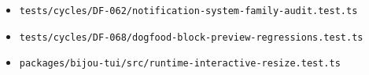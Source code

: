 \begin{itemize}
\tightlist
\item
  \texttt{t\allowbreak{}e\allowbreak{}s\allowbreak{}t\allowbreak{}s\allowbreak{}/\allowbreak{}c\allowbreak{}y\allowbreak{}c\allowbreak{}l\allowbreak{}e\allowbreak{}s\allowbreak{}/\allowbreak{}D\allowbreak{}F\allowbreak{}-\allowbreak{}0\allowbreak{}6\allowbreak{}2\allowbreak{}/\allowbreak{}n\allowbreak{}o\allowbreak{}t\allowbreak{}i\allowbreak{}f\allowbreak{}i\allowbreak{}c\allowbreak{}a\allowbreak{}t\allowbreak{}i\allowbreak{}o\allowbreak{}n\allowbreak{}-\allowbreak{}s\allowbreak{}y\allowbreak{}s\allowbreak{}t\allowbreak{}e\allowbreak{}m\allowbreak{}-\allowbreak{}f\allowbreak{}a\allowbreak{}m\allowbreak{}i\allowbreak{}l\allowbreak{}y\allowbreak{}-\allowbreak{}a\allowbreak{}u\allowbreak{}d\allowbreak{}i\allowbreak{}t\allowbreak{}.\allowbreak{}t\allowbreak{}e\allowbreak{}s\allowbreak{}t\allowbreak{}.\allowbreak{}t\allowbreak{}s}
\item
  \texttt{t\allowbreak{}e\allowbreak{}s\allowbreak{}t\allowbreak{}s\allowbreak{}/\allowbreak{}c\allowbreak{}y\allowbreak{}c\allowbreak{}l\allowbreak{}e\allowbreak{}s\allowbreak{}/\allowbreak{}D\allowbreak{}F\allowbreak{}-\allowbreak{}0\allowbreak{}6\allowbreak{}8\allowbreak{}/\allowbreak{}d\allowbreak{}o\allowbreak{}g\allowbreak{}f\allowbreak{}o\allowbreak{}o\allowbreak{}d\allowbreak{}-\allowbreak{}b\allowbreak{}l\allowbreak{}o\allowbreak{}c\allowbreak{}k\allowbreak{}-\allowbreak{}p\allowbreak{}r\allowbreak{}e\allowbreak{}v\allowbreak{}i\allowbreak{}e\allowbreak{}w\allowbreak{}-\allowbreak{}r\allowbreak{}e\allowbreak{}g\allowbreak{}r\allowbreak{}e\allowbreak{}s\allowbreak{}s\allowbreak{}i\allowbreak{}o\allowbreak{}n\allowbreak{}s\allowbreak{}.\allowbreak{}t\allowbreak{}e\allowbreak{}s\allowbreak{}t\allowbreak{}.\allowbreak{}t\allowbreak{}s}
\item
  \texttt{p\allowbreak{}a\allowbreak{}c\allowbreak{}k\allowbreak{}a\allowbreak{}g\allowbreak{}e\allowbreak{}s\allowbreak{}/\allowbreak{}b\allowbreak{}i\allowbreak{}j\allowbreak{}o\allowbreak{}u\allowbreak{}-\allowbreak{}t\allowbreak{}u\allowbreak{}i\allowbreak{}/\allowbreak{}s\allowbreak{}r\allowbreak{}c\allowbreak{}/\allowbreak{}r\allowbreak{}u\allowbreak{}n\allowbreak{}t\allowbreak{}i\allowbreak{}m\allowbreak{}e\allowbreak{}-\allowbreak{}i\allowbreak{}n\allowbreak{}t\allowbreak{}e\allowbreak{}r\allowbreak{}a\allowbreak{}c\allowbreak{}t\allowbreak{}i\allowbreak{}v\allowbreak{}e\allowbreak{}-\allowbreak{}r\allowbreak{}e\allowbreak{}s\allowbreak{}i\allowbreak{}z\allowbreak{}e\allowbreak{}.\allowbreak{}t\allowbreak{}e\allowbreak{}s\allowbreak{}t\allowbreak{}.\allowbreak{}t\allowbreak{}s}

\end{itemize}
